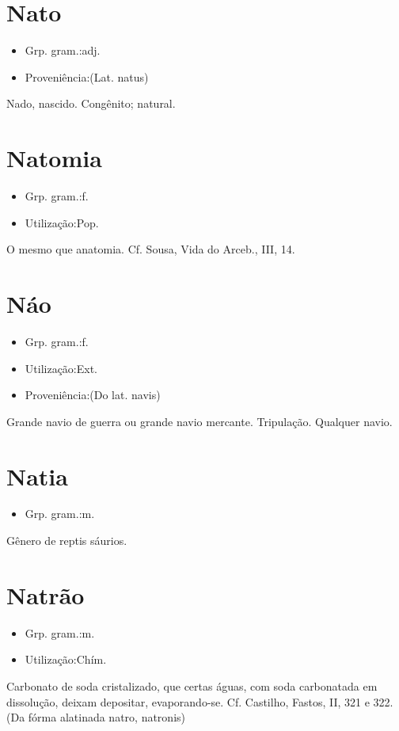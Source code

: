 \section{Nato}
\begin{itemize}
\item {Grp. gram.:adj.}
\end{itemize}
\begin{itemize}
\item {Proveniência:(Lat. \textunderscore natus\textunderscore )}
\end{itemize}
Nado, nascido.
Congênito; natural.
\section{Natomia}
\begin{itemize}
\item {Grp. gram.:f.}
\end{itemize}
\begin{itemize}
\item {Utilização:Pop.}
\end{itemize}
O mesmo que \textunderscore anatomia\textunderscore . Cf. Sousa, \textunderscore Vida do Arceb.\textunderscore , III, 14.
\section{Náo}
\begin{itemize}
\item {Grp. gram.:f.}
\end{itemize}
\begin{itemize}
\item {Utilização:Ext.}
\end{itemize}
\begin{itemize}
\item {Proveniência:(Do lat. \textunderscore navis\textunderscore )}
\end{itemize}
Grande navio de guerra ou grande navio mercante.
Tripulação.
Qualquer navio.
\section{Natia}
\begin{itemize}
\item {Grp. gram.:m.}
\end{itemize}
Gênero de reptis sáurios.
\section{Natrão}
\begin{itemize}
\item {Grp. gram.:m.}
\end{itemize}
\begin{itemize}
\item {Utilização:Chím.}
\end{itemize}
Carbonato de soda cristalizado, que certas águas, com soda carbonatada em dissolução, deixam depositar, evaporando-se. Cf. Castilho, \textunderscore Fastos\textunderscore , II, 321 e 322.
(Da fórma alatinada \textunderscore natro\textunderscore , \textunderscore natronis\textunderscore )
